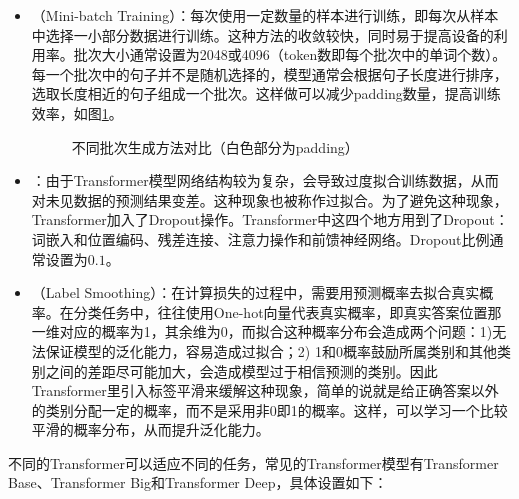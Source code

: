 \begin{itemize}
\vspace{0.5em}
\item {\small{}}（Mini-batch Training）：每次使用一定数量的样本进行训练，即每次从样本中选择一小部分数据进行训练。这种方法的收敛较快，同时易于提高设备的利用率。批次大小通常设置为2048或4096（token数即每个批次中的单词个数）。每一个批次中的句子并不是随机选择的，模型通常会根据句子长度进行排序，选取长度相近的句子组成一个批次。这样做可以减少padding数量，提高训练效率，如图\ref{fig:12-18}。

\begin{figure}[htp]
\centering

\caption{不同批次生成方法对比（白色部分为padding）}
\label{fig:12-18}
\end{figure}
\vspace{0.5em}
\item {\small{}}：由于Transformer模型网络结构较为复杂，会导致过度拟合训练数据，从而对未见数据的预测结果变差。这种现象也被称作过拟合。为了避免这种现象，Transformer加入了Dropout操作。Transformer中这四个地方用到了Dropout：词嵌入和位置编码、残差连接、注意力操作和前馈神经网络。Dropout比例通常设置为$0.1$。
\vspace{0.5em}
\item {\small{}}（Label Smoothing）：在计算损失的过程中，需要用预测概率去拟合真实概率。在分类任务中，往往使用One-hot向量代表真实概率，即真实答案位置那一维对应的概率为1，其余维为0，而拟合这种概率分布会造成两个问题：1)无法保证模型的泛化能力，容易造成过拟合；2) 1和0概率鼓励所属类别和其他类别之间的差距尽可能加大，会造成模型过于相信预测的类别。因此Transformer里引入标签平滑来缓解这种现象，简单的说就是给正确答案以外的类别分配一定的概率，而不是采用非0即1的概率。这样，可以学习一个比较平滑的概率分布，从而提升泛化能力。
\vspace{0.5em}
\end{itemize}

\parinterval 不同的Transformer可以适应不同的任务，常见的Transformer模型有Transformer Base、Transformer Big和Transformer Deep，具体设置如下：

